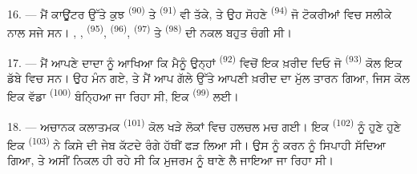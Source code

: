 16. --- ਮੈਂ ਕਾਊਂਟਰ ਉੱਤੇ ਕੁਝ  \textsuperscript{(90)} ਤੇ
 \textsuperscript{(91)} ਵੀ ਤੱਕੇ, ਤੇ ਉਹ ਸੋਹਣੇ
 \textsuperscript{(94)} ਜੋ ਟੋਕਰੀਆਂ ਵਿਚ ਸਲੀਕੇ ਨਾਲ ਸਜੇ ਸਨ।
, ,  \textsuperscript{(95)},
 \textsuperscript{(96)},  \textsuperscript{(97)} ਤੇ
 \textsuperscript{(98)} ਦੀ ਨਕਲ ਬਹੁਤ ਚੰਗੀ ਸੀ।

\VUsaut{4.4mm}
\VUsaut{2.8mm}

17. --- ਮੈਂ ਆਪਣੇ ਦਾਦਾ ਨੂੰ ਆਖਿਆ ਕਿ ਮੈਨੂੰ ਉਨ੍ਹਾਂ 
\textsuperscript{(92)} ਵਿਚੋਂ ਇਕ ਖ਼ਰੀਦ ਦਿਓ ਜੋ 
\textsuperscript{(93)} ਕੋਲ ਇਕ ਡੱਬੇ ਵਿਚ ਸਨ। ਉਹ ਮੰਨ ਗਏ, ਤੇ ਮੈਂ ਆਪ ਗੱਲੇ ਉੱਤੇ ਆਪਣੀ
ਖ਼ਰੀਦ ਦਾ ਮੁੱਲ ਤਾਰਨ ਗਿਆ, ਜਿਸ ਕੋਲ ਇਕ ਵੱਡਾ  \textsuperscript{(100)}
ਬੰਨ੍ਹਿਆ ਜਾ ਰਿਹਾ ਸੀ, ਇਕ  \textsuperscript{(99)} ਲਈ।

18. --- ਅਚਾਨਕ ਕਲਾਤਮਕ  \textsuperscript{(101)} ਕੋਲ ਖੜੇ ਲੋਕਾਂ
ਵਿਚ ਹਲਚਲ ਮਚ ਗਈ। ਇਕ  \textsuperscript{(102)} ਨੂੰ ਹੁਣੇ ਹੁਣੇ ਇਕ
 \textsuperscript{(103)} ਨੇ ਕਿਸੇ ਦੀ ਜੇਬ ਕੱਟਦੇ ਰੰਗੇ ਹੱਥੀਂ ਫੜ
ਲਿਆ ਸੀ। ਉਸ ਨੂੰ  ਕਰਨ ਨੂੰ ਸਿਪਾਹੀ ਸੱਦਿਆ ਗਿਆ, ਤੇ ਅਸੀਂ ਨਿਕਲ ਹੀ ਰਹੇ ਸੀ
ਕਿ ਮੁਜਰਮ ਨੂੰ ਥਾਣੇ ਲੈ ਜਾਇਆ ਜਾ ਰਿਹਾ ਸੀ।
\VUsaut{6.0mm}
\VUfilet{22mm}
